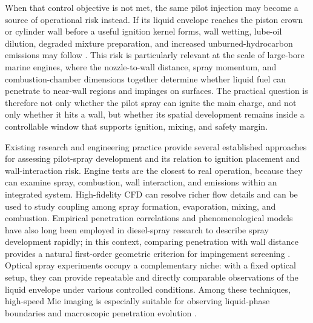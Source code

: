When that control objective is not met, the same pilot injection may become a source of operational risk instead.
If its liquid envelope reaches the piston crown or cylinder wall before a useful ignition kernel forms,
wall wetting, lube-oil dilution, degraded mixture preparation, and increased unburned-hydrocarbon emissions may follow
\cite{peraza2022swi,ahmad2025fueldilution,MorieiraMotaPanao2010}.
This risk is particularly relevant at the scale of large-bore marine engines,
where the nozzle-to-wall distance, spray momentum, and combustion-chamber dimensions together determine
whether liquid fuel can penetrate to near-wall regions and impinges on surfaces.
The practical question is therefore not only whether the pilot spray can ignite the main charge, and not only whether it hits a wall,
but whether its spatial development remains inside a controllable window that supports ignition, mixing, and safety margin.

Existing research and engineering practice provide several established approaches for assessing
pilot-spray development and its relation to ignition placement and wall-interaction risk.
Engine tests are the closest to real operation, because they can examine spray, combustion, wall interaction,
and emissions within an integrated system.
High-fidelity CFD can resolve richer flow details and can be used to study coupling among spray formation, evaporation, mixing, and combustion.
Empirical penetration correlations and phenomenological models have also long been employed in diesel-spray research to describe spray development rapidly;
in this context, comparing penetration with wall distance provides a natural first-order geometric criterion for impingement screening
\cite{HiroyasuArai1990,NaberSiebers1996,Baumgarten2006MixFormation}.
Optical spray experiments occupy a complementary niche:
with a fixed optical setup, they can provide repeatable and directly comparable observations of the liquid envelope under various controlled conditions.
Among these techniques, high-speed Mie imaging is especially suitable for observing liquid-phase boundaries and macroscopic penetration evolution
\cite{Linne2013SprayImaging}.

